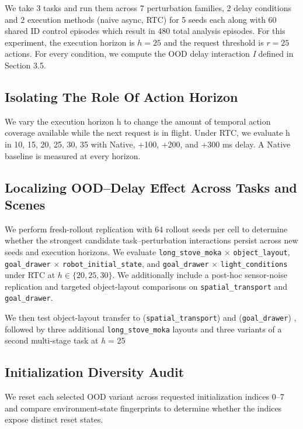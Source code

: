 \documentclass{article}
\begin{document}
We take 3 tasks and run them across 7 perturbation families, 2 delay conditions and 2 execution methods (naive async, RTC) for 5 seeds each along with 60 shared ID control episodes which result in 480 total analysis episodes. For this experiment, the execution horizon is $h=25$ and the request threshold is $r=25$ actions. For every condition, we compute the OOD delay interaction \textit{I} defined in Section 3.5.

\subsection{Isolating The Role Of Action Horizon}
We vary the execution horizon h to change the amount of temporal action
coverage available while the next request is in flight. Under RTC, we
evaluate h in {10, 15, 20, 25, 30, 35} with Native, +100, +200, and +300 ms delay. A Native baseline is measured at every horizon.

\subsection{Localizing OOD--Delay Effect Across Tasks and Scenes}

We perform fresh-rollout replication with 64 rollout seeds per cell to determine whether the strongest candidate task--perturbation interactions persist across new seeds and execution horizons. We evaluate \texttt{long\_stove\_moka} $\times$ \texttt{object\_layout}, \texttt{goal\_drawer} $\times$ \texttt{robot\_initial\_state}, and \texttt{goal\_drawer} $\times$ \texttt{light\_conditions} under RTC at $h \in \{20,25,30\}$. We additionally include a post-hoc sensor-noise replication and targeted object-layout comparisons on \texttt{spatial\_transport} and \texttt{goal\_drawer}.

We then test object-layout
transfer to (\texttt{spatial\_transport}) and (\texttt{goal\_drawer}) , followed by three
additional \texttt{long\_stove\_moka} layouts and three variants of a second multi-stage task at \textit{h} = 25

\subsection{Initialization Diversity Audit}
We reset each selected OOD variant across requested initialization indices 0--7 and compare environment-state fingerprints to determine whether the indices expose distinct reset states.
\end{document}
